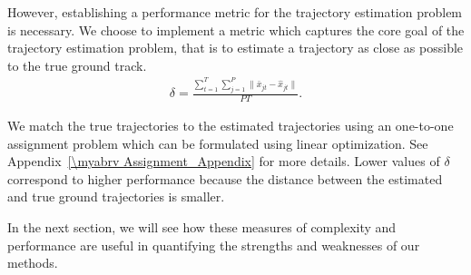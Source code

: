 However, establishing a performance metric for the trajectory estimation problem is necessary. We choose to implement a metric which captures the core goal of the trajectory estimation problem, that is to estimate a trajectory as close as possible to the true ground track. 
\begin{align}
	\delta = \frac{\sum\limits_{t=1}^{T}\sum\limits_{j=1}^{P}\| \bar{x}_{jt} - \hat{x}_{jt} \|}{PT}.
\end{align}

We match the true trajectories to the estimated trajectories using an one-to-one assignment problem which can be formulated using linear optimization. See Appendix~\ref{\myabrv Assignment_Appendix} for more details. Lower values of $\delta$ correspond to higher performance because the distance between the estimated and true ground trajectories is smaller. 

In the next section, we will see how these measures of complexity and performance are useful in quantifying the strengths and weaknesses of our methods.

